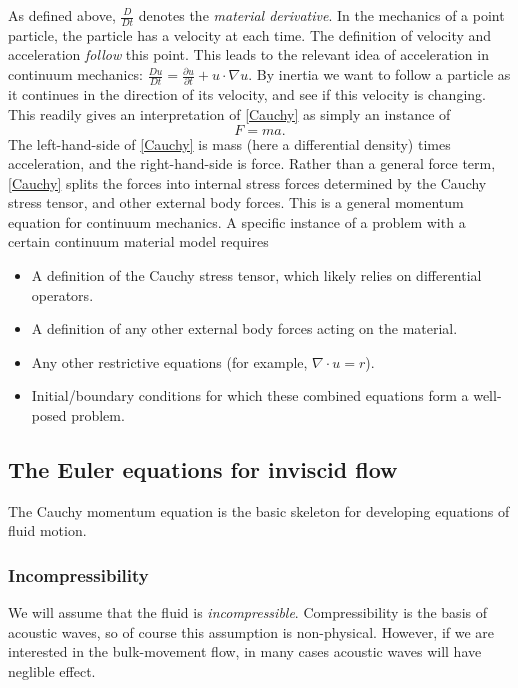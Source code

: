 \documentclass{article}
\begin{document}
As defined above, $\frac{D}{Dt}$ denotes the \textit{material derivative}. In the mechanics of a point particle,
the particle has a velocity at each time. The definition of velocity and acceleration \textit{follow} this point.
This leads to the relevant idea of acceleration in continuum mechanics:
$\frac{Du}{Dt} = \frac{\partial u}{\partial t} + u\cdot \nabla u$.
By inertia we want to follow a particle as it continues in the direction of its velocity, and see if this velocity is changing.
This readily gives an interpretation of \eqref{Cauchy} as simply an instance of
\begin{equation}\label{Newton}
    F = ma.
\end{equation}
The left-hand-side of \eqref{Cauchy} is mass (here a differential density) times acceleration,
and the right-hand-side is force. Rather than a general force term, \eqref{Cauchy} splits the forces into internal stress forces
determined by the Cauchy stress tensor, and other external body forces. This is a general momentum equation for
continuum mechanics. A specific instance of a problem with a certain continuum material model requires
\begin{itemize}
    \item A definition of the Cauchy stress tensor, which likely relies on differential operators.
    \item A definition of any other external body forces acting on the material.
    \item Any other restrictive equations (for example, $\nabla \cdot u = r$).
    \item Initial/boundary conditions for which these combined equations form a well-posed problem.
\end{itemize}
\subsection{The Euler equations for inviscid flow} %
The Cauchy momentum equation is the basic skeleton for developing equations of fluid motion.

\subsubsection{Incompressibility}
We will assume that the fluid is \textit{incompressible}.
Compressibility is the basis of acoustic waves, so of course this assumption is non-physical. However, if we are interested in the bulk-movement flow,
in many cases acoustic waves will have neglible effect.
\end{document}
